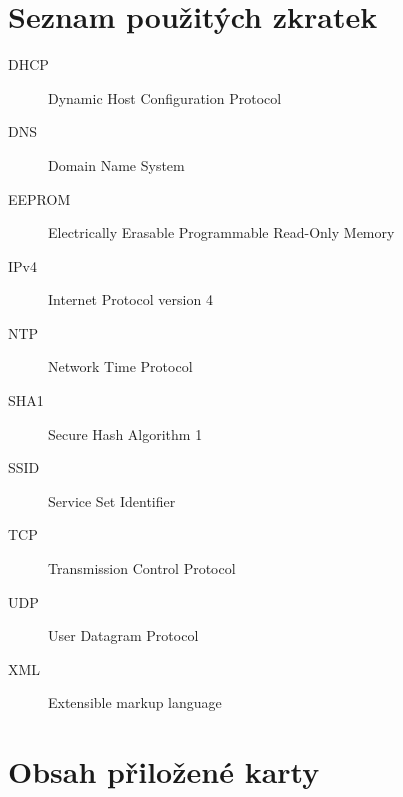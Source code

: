 \documentclass[thesis=B,czech]{FITthesis}[2012/10/20]
\begin{document}
\chapter{Seznam použitých zkratek}
\begin{description}
	\item[DHCP] Dynamic Host Configuration Protocol
	\item[DNS] Domain Name System
	\item[EEPROM] Electrically Erasable Programmable Read-Only Memory
	\item[IPv4] Internet Protocol version 4
	\item[NTP] Network Time Protocol
	\item[SHA1] Secure Hash Algorithm 1
	\item[SSID] Service Set Identifier
	\item[TCP] Transmission Control Protocol
	\item[UDP] User Datagram Protocol
	\item[XML] Extensible markup language
\end{description}

\chapter{Obsah přiložené karty}


\begin{figure}
\end{figure}
\end{document}
